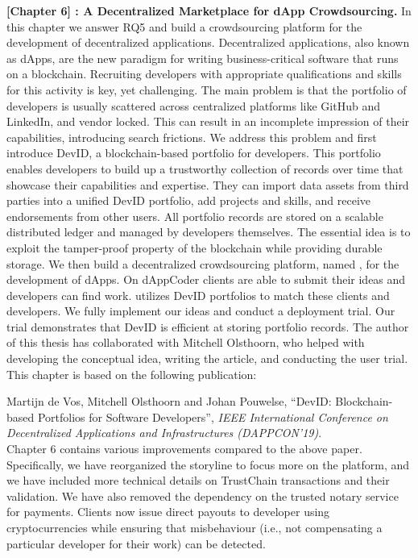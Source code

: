 \textbf{[Chapter 6] \Dappcoder{}: A Decentralized Marketplace for dApp Crowdsourcing.}
In this chapter we answer RQ5 and build a crowdsourcing platform for the development of decentralized applications.
Decentralized applications, also known as dApps, are the new paradigm for writing business-critical software that runs on a blockchain.
Recruiting developers with appropriate qualifications and skills for this activity is key, yet challenging.
The main problem is that the portfolio of developers is usually scattered across centralized platforms like GitHub and LinkedIn, and vendor locked.
This can result in an incomplete impression of their capabilities, introducing search frictions.
We address this problem and first introduce DevID, a blockchain-based portfolio for developers.
This portfolio enables developers to build up a trustworthy collection of records over time that showcase their capabilities and expertise.
They can import data assets from third parties into a unified DevID portfolio, add projects and skills, and receive endorsements from other users.
All portfolio records are stored on a scalable distributed ledger and managed by developers themselves.
The essential idea is to exploit the tamper-proof property of the blockchain while providing durable storage.
We then build a decentralized crowdsourcing platform, named \Dappcoder{}, for the development of dApps.
On dAppCoder clients are able to submit their ideas and developers can find work.
\Dappcoder{} utilizes DevID portfolios to match these clients and developers.
We fully implement our ideas and conduct a deployment trial.
Our trial demonstrates that DevID is efficient at storing portfolio records.
The author of this thesis has collaborated with Mitchell Olsthoorn, who helped with developing the conceptual idea, writing the article, and conducting the user trial.
This chapter is based on the following publication:

Martijn de Vos, Mitchell Olsthoorn and Johan Pouwelse, \enquote{DevID: Blockchain-based Portfolios for Software Developers}, \emph{IEEE International Conference on Decentralized Applications and Infrastructures (DAPPCON'19)}.\\

Chapter 6 contains various improvements compared to the above paper.
Specifically, we have reorganized the storyline to focus more on the \Dappcoder{} platform, and we have included more technical details on TrustChain transactions and their validation.
We have also removed the dependency on the trusted notary service for payments.
Clients now issue direct payouts to developer using cryptocurrencies while ensuring that misbehaviour (i.e., not compensating a particular developer for their work) can be detected.\\


